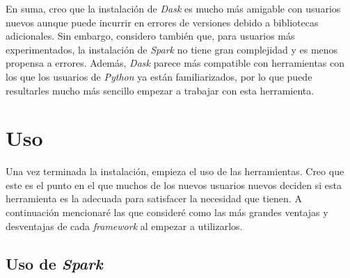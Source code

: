 En suma, creo que la instalación de \textit{Dask} es mucho más amigable con usuarios nuevos aunque puede incurrir en errores de versiones debido a bibliotecas adicionales. Sin embargo, considero también que, para usuarios más experimentados, la instalación de \textit{Spark} no tiene gran complejidad y es menos propensa a errores. Además, \textit{Dask} parece más compatible con herramientas con los que los usuarios de \textit{Python} ya están familiarizados, por lo que puede resultarles mucho más sencillo empezar a trabajar con esta herramienta. 

\section{Uso}

Una vez terminada la instalación, empieza el uso de las herramientas. Creo que este es el punto en el que muchos de los nuevos usuarios nuevos deciden si esta herramienta es la adecuada para satisfacer la necesidad que tienen. A continuación mencionaré las que consideré como las más grandes ventajas y desventajas de cada \textit{framework} al empezar a utilizarlos.

\subsection{Uso de \textit{Spark}}

